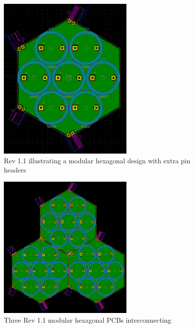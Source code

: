 \begin{figure}[ht!]
    \centering
    \includegraphics[width=0.6\textwidth]{Figures/Design/PCB/closeups/hexrev1.1.png}
    \caption{Rev 1.1 illustrating a modular hexagonal design with extra pin headers}
    \label{fig:modHex1.1}
\end{figure}

\begin{figure}[ht!]
    \centering
    \includegraphics[width=0.6\textwidth]{Figures/Design/PCB/closeups/3xhex1.1.png}
    \caption{Three Rev 1.1 modular hexagonal PCBs interconnecting}
    \label{fig:3modHex1.1}
\end{figure}


